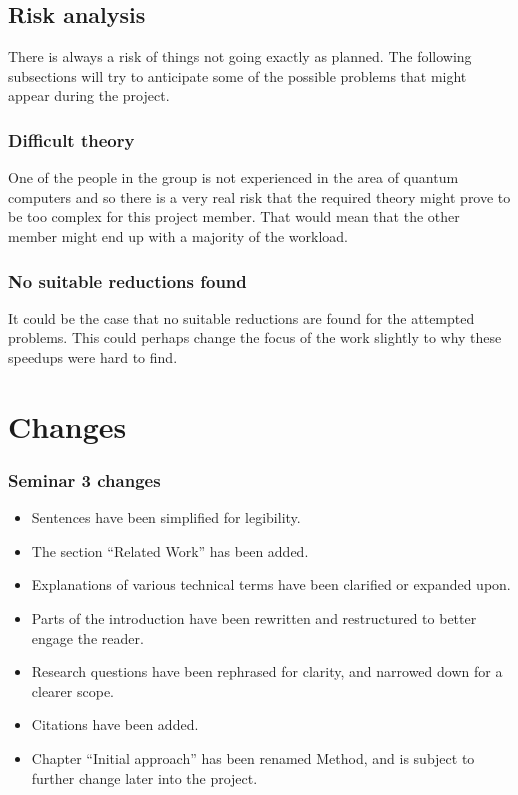 \documentclass[msc,lith,english]{liuthesis}
\begin{document}
\section{Risk analysis}
There is always a risk of things not going exactly as planned. The following subsections will try to anticipate some of the possible problems that might appear during the project.

\subsection{Difficult theory}
One of the people in the group is not experienced in the area of quantum computers and so there is a very real risk that the required theory might prove to be too complex for this project member. That would mean that the other member might end up with a majority of the workload.

\subsection{No suitable reductions found}
It could be the case that no suitable reductions are found for the attempted problems. This could perhaps change the focus of the work slightly to why these speedups were hard to find.

\appendix
\chapter{Changes}
\subsection{Seminar 3 changes}
\begin{itemize}
    \item Sentences have been simplified for legibility.
    \item The section ``Related Work'' has been added.
    \item Explanations of various technical terms have been clarified or expanded upon.
    \item Parts of the introduction have been rewritten and restructured to better engage the reader.
    \item Research questions have been rephrased for clarity, and narrowed down for a clearer scope.
    \item Citations have been added.
    \item Chapter ``Initial approach'' has been renamed Method, and is subject to further change later into the project.
\end{itemize}
\end{document}
